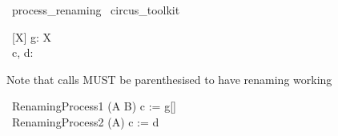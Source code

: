 \begin{zsection}
  \SECTION\ process\_renaming \parents\ circus\_toolkit
\end{zsection}

\begin{circus}
   \circchannel\ [X] g: X \cross \nat \\
   \circchannel\ c, d: \nat \cross \nat
\end{circus}

Note that calls MUST be parenthesised to have renaming working
%
\begin{circus}
   \circprocess\ RenamingProcess1 \circdef (A \extchoice B) \lcircrename c := g[\nat] \rcircrename \\
   \circprocess\ RenamingProcess2 \circdef (A) \lcircrename c := d \rcircrename
\end{circus}
